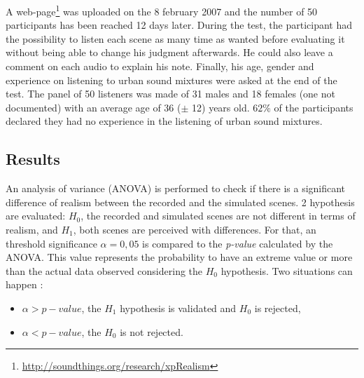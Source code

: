\documentclass[a4,11pt,twocolumn]{article}
\begin{document}
A web-page\footnote{\url{http://soundthings.org/research/xpRealism}} was uploaded on the 8 february 2007 and the number of 50 participants has been reached 12 days later. During the test, the participant had the possibility to listen each scene as many time as wanted before evaluating it without being able to change his judgment afterwards. He could also leave a comment on each audio to explain his note. Finally, his age, gender and experience on listening to urban sound mixtures were asked at the end of the test. The panel of 50 listeners was made of 31 males and 18 females (one not documented) with an average age of 36 ($\pm$ 12) years old. $62\%$ of the participants declared they had no experience in the listening of urban sound mixtures.\\




\subsection{Results}

An analysis of variance (ANOVA) is performed to check if there is a significant difference of realism between the recorded and the simulated scenes. 2 hypothesis are evaluated: $H_0$, the recorded and simulated scenes are not different in terms of realism, and $H_1$, both scenes are perceived with differences. For that, an threshold significance $\alpha=0,05$ is compared to the \textit{p-value} calculated by the ANOVA. This value represents the probability to have an extreme value or more than the actual data observed considering the $H_0$ hypothesis. Two situations can happen :
\begin{itemize}
\item $\alpha > p-value$, the $H_1$ hypothesis is validated and $H_0$ is rejected,
\item $\alpha < p-value$, the $H_0$ is not rejected.
\end{itemize}
\end{document}
